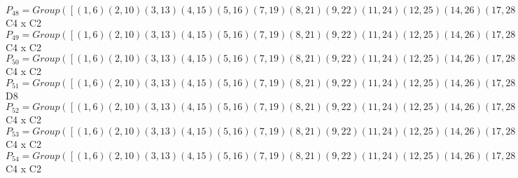 \documentclass[varwidth=\maxdimen,border=10]{standalone}
\begin{document}
\begin{tabular}
$P_{48} = Group( [ ( 1, 6)( 2,10)( 3,13)( 4,15)( 5,16)( 7,19)( 8,21)( 9,22)(11,24)(12,25)(14,26)(17,28)(18,29)(20,30)(23,31)(27,32), ( 1,31, 6,23)( 2,32,10,27)( 3,14,13,26)( 4,25,15,12)( 5,24,16,11)( 7,20,19,30)( 8,29,21,18)( 9,28,22,17), ( 1, 2)( 3,19)( 4, 8)( 5,22)( 6,10)( 7,13)( 9,16)(11,28)(12,18)(14,30)(15,21)(17,24)(20,26)(23,27)(25,29)(31,32) ] )\cong$ C4 x C2\ \\
$P_{49} = Group( [ ( 1, 6)( 2,10)( 3,13)( 4,15)( 5,16)( 7,19)( 8,21)( 9,22)(11,24)(12,25)(14,26)(17,28)(18,29)(20,30)(23,31)(27,32), ( 1,22, 6, 9)( 2,16,10, 5)( 3,18,13,29)( 4,30,15,20)( 7,12,19,25)( 8,26,21,14)(11,27,24,32)(17,23,28,31), ( 1,17)( 2,11)( 3, 8)( 4, 7)( 5,32)( 6,28)( 9,31)(10,24)(12,30)(13,21)(14,29)(15,19)(16,27)(18,26)(20,25)(22,23) ] )\cong$ C4 x C2\ \\
$P_{50} = Group( [ ( 1, 6)( 2,10)( 3,13)( 4,15)( 5,16)( 7,19)( 8,21)( 9,22)(11,24)(12,25)(14,26)(17,28)(18,29)(20,30)(23,31)(27,32), ( 1,18, 6,29)( 2,12,10,25)( 3, 9,13,22)( 4,32,15,27)( 5,19,16, 7)( 8,31,21,23)(11,30,24,20)(14,17,26,28), ( 1,24, 6,11)( 2,28,10,17)( 3, 4,13,15)( 5,31,16,23)( 7, 8,19,21)( 9,32,22,27)(12,14,25,26)(18,20,29,30) ] )\cong$ C4 x C2\ \\
$P_{51} = Group( [ ( 1, 6)( 2,10)( 3,13)( 4,15)( 5,16)( 7,19)( 8,21)( 9,22)(11,24)(12,25)(14,26)(17,28)(18,29)(20,30)(23,31)(27,32), ( 1,12, 6,25)( 2,18,10,29)( 3,16,13, 5)( 4,31,15,23)( 7,22,19, 9)( 8,32,21,27)(11,14,24,26)(17,20,28,30), ( 1,17)( 2,11)( 3, 8)( 4, 7)( 5,32)( 6,28)( 9,31)(10,24)(12,30)(13,21)(14,29)(15,19)(16,27)(18,26)(20,25)(22,23) ] )\cong$ D8\ \\
$P_{52} = Group( [ ( 1, 6)( 2,10)( 3,13)( 4,15)( 5,16)( 7,19)( 8,21)( 9,22)(11,24)(12,25)(14,26)(17,28)(18,29)(20,30)(23,31)(27,32), ( 1,18, 6,29)( 2,12,10,25)( 3, 9,13,22)( 4,32,15,27)( 5,19,16, 7)( 8,31,21,23)(11,30,24,20)(14,17,26,28), ( 1,17)( 2,11)( 3, 8)( 4, 7)( 5,32)( 6,28)( 9,31)(10,24)(12,30)(13,21)(14,29)(15,19)(16,27)(18,26)(20,25)(22,23) ] )\cong$ C4 x C2\ \\
$P_{53} = Group( [ ( 1, 6)( 2,10)( 3,13)( 4,15)( 5,16)( 7,19)( 8,21)( 9,22)(11,24)(12,25)(14,26)(17,28)(18,29)(20,30)(23,31)(27,32), ( 1,30)( 2,26)( 3,27)( 4, 9)( 5, 8)( 6,20)( 7,23)(10,14)(11,29)(12,28)(13,32)(15,22)(16,21)(17,25)(18,24)(19,31), ( 1, 3, 6,13)( 2, 7,10,19)( 4,24,15,11)( 5,12,16,25)( 8,28,21,17)( 9,18,22,29)(14,31,26,23)(20,32,30,27) ] )\cong$ C4 x C2\ \\
$P_{54} = Group( [ ( 1, 6)( 2,10)( 3,13)( 4,15)( 5,16)( 7,19)( 8,21)( 9,22)(11,24)(12,25)(14,26)(17,28)(18,29)(20,30)(23,31)(27,32), ( 1,14, 6,26)( 2,20,10,30)( 3,23,13,31)( 4,16,15, 5)( 7,27,19,32)( 8,22,21, 9)(11,25,24,12)(17,29,28,18), ( 1,19)( 2,13)( 3,10)( 4,17)( 5,18)( 6, 7)( 8,11)( 9,12)(14,32)(15,28)(16,29)(20,31)(21,24)(22,25)(23,30)(26,27) ] )\cong$ C4 x C2\ \\

\end{tabular}
\end{document}
